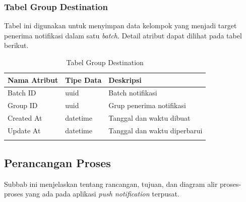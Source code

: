 \subsubsection{Tabel Group Destination}
\par Tabel ini digunakan untuk menyimpan data kelompok yang menjadi target penerima notifikasi dalam satu \textit{batch}. Detail atribut dapat dilihat pada tabel berikut.
\begin{longtable}{|p{2.5cm}|p{2cm}|p{4.5cm}|}
    \hline
    \textbf{Nama Atribut} & \textbf{Tipe Data} & \textbf{Deskripsi} \\ \hline
    Batch ID & uuid & Batch notifikasi \\ \hline
    Group ID & uuid & Grup penerima notifikasi \\ \hline
    Created At & datetime & Tanggal dan waktu dibuat \\ \hline
    Update At & datetime & Tanggal dan waktu diperbarui \\ \hline
    \caption{Tabel Group Destination}
\end{longtable}

\subsection{Perancangan Proses}
\par Subbab ini menjelaskan tentang rancangan, tujuan, dan diagram alir proses-proses yang ada pada aplikasi \textit{push notification} terpusat.

